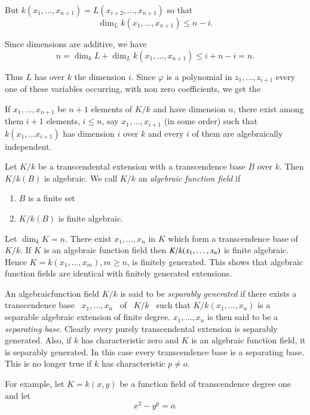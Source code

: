 But $k(x_1,\ldots,x_{n+1})=L(x_{i+2},\ldots,x_{n+1})$ so that
$$
\dim_L k(x_1,\ldots,x_{n+1})\leq n-i . 
$$

Since dimensions are additive, we have
$$ 
n=\dim_k L+ \dim_L k(x_1,\ldots,x_{n+1})\leq i+n-i=n .
$$

Thus $L$ has over $k$ the dimension $i$. Since $\varphi$ is a
polynomial in $z_1,\ldots,z_{i+1}$ every one of these variables
occurring, with non zero coefficients, we get the 

\begin{coro*}
 If $x_1,\ldots,x_{n+1}$ be $n+1$ elements of $K/k$ and have
  dimension $n$, there exist among them $i+1$ elements, $i \leq n$,
  say $x_1,\ldots ,x_{i+1}$ (in some order) such that $k(x_1,\ldots
  x_{i+1})$ has dimension $i$ over $k$ and every $i$ of them are
  algebraically independent. 
\end{coro*}

Let $K/k$ be a transcendental extension with a transcendence base $B$
over $k$. Then $K/k(B)$ is algebraic. We call $K/k$ an
\textit{algebraic function field} if  
\begin{enumerate}
\renewcommand{\labelenumi}{(\theenumi)}
\item $B$ is a finite set
\item $K/k(B)$ is finite algebraic.
\end{enumerate}

Let $\dim_k K=n$. There exist $x_1,\ldots,x_n$ in $K$ which form a
transcendence base of $K/k$. If $K$ is an algebraic function field then
$K/k(x_1,\break \ldots,x_n)$ is finite algebraic. Hence
$K=k(x_1,\ldots,x_m), m \geq n$, is finitely generated. This shows that
algebraic function fields are identical with finitely generated
extensions. 

An algebraic\pageoriginale function field $K/k$ is said to be
\textit{separably 
  generated} if there exists a transcendence base \, $x_1,\ldots,x_n$ \, of
\, $K/k$ \, such that \break $K/k (x_1,\ldots,x_n)$ is a separable algebraic
extension of finite degree. \break $x_1,\ldots,x_n$ is then said to be a
\textit{separating base}. Clearly every purely transcendental
extension is separably generated. Also, if $k$ has characteristic zero
and $K$ is an algebraic function field, it is separably generated. In
this case every transcendence base is a separating base. This is no
longer true if $k$ has characteristic $p\neq o$. 

For example, let $K=k(x,y)$ be a function field of transcendence
degree one and let 
$$
x^2-y^p=o.
$$


